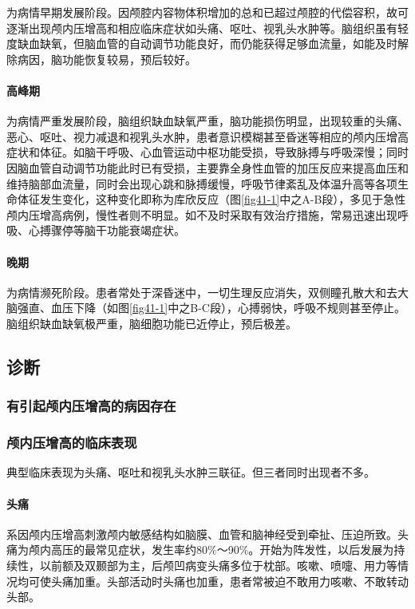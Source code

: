 为病情早期发展阶段。因颅腔内容物体积增加的总和已超过颅腔的代偿容积，故可逐渐出现颅内压增高和相应临床症状如头痛、呕吐、视乳头水肿等。脑组织虽有轻度缺血缺氧，但脑血管的自动调节功能良好，而仍能获得足够血流量，如能及时解除病因，脑功能恢复较易，预后较好。

\paragraph{高峰期}

为病情严重发展阶段，脑组织缺血缺氧严重，脑功能损伤明显，出现较重的头痛、恶心、呕吐、视力减退和视乳头水肿，患者意识模糊甚至昏迷等相应的颅内压增高症状和体征。如脑干呼吸、心血管运动中枢功能受损，导致脉搏与呼吸深慢；同时因脑血管自动调节功能此时已有受损，主要靠全身性血管的加压反应来提高血压和维持脑部血流量，同时会出现心跳和脉搏缓慢，呼吸节律紊乱及体温升高等各项生命体征发生变化，这种变化即称为库欣反应（图\ref{fig41-1}中之A-B段），多见于急性颅内压增高病例，慢性者则不明显。如不及时采取有效治疗措施，常易迅速出现呼吸、心搏骤停等脑干功能衰竭症状。

\paragraph{晚期}

为病情濒死阶段。患者常处于深昏迷中，一切生理反应消失，双侧瞳孔散大和去大脑强直、血压下降（如图\ref{fig41-1}中之B-C段），心搏弱快，呼吸不规则甚至停止。脑组织缺血缺氧极严重，脑细胞功能已近停止，预后极差。

\subsection{诊断}

\subsubsection{有引起颅内压增高的病因存在}

\subsubsection{颅内压增高的临床表现}

典型临床表现为头痛、呕吐和视乳头水肿三联征。但三者同时出现者不多。

\paragraph{头痛}

系因颅内压增高刺激颅内敏感结构如脑膜、血管和脑神经受到牵扯、压迫所致。头痛为颅内高压的最常见症状，发生率约80\%～90\%。开始为阵发性，以后发展为持续性，以前额及双颞部为主，后颅凹病变头痛多位于枕部。咳嗽、喷嚏、用力等情况均可使头痛加重。头部活动时头痛也加重，患者常被迫不敢用力咳嗽、不敢转动头部。


